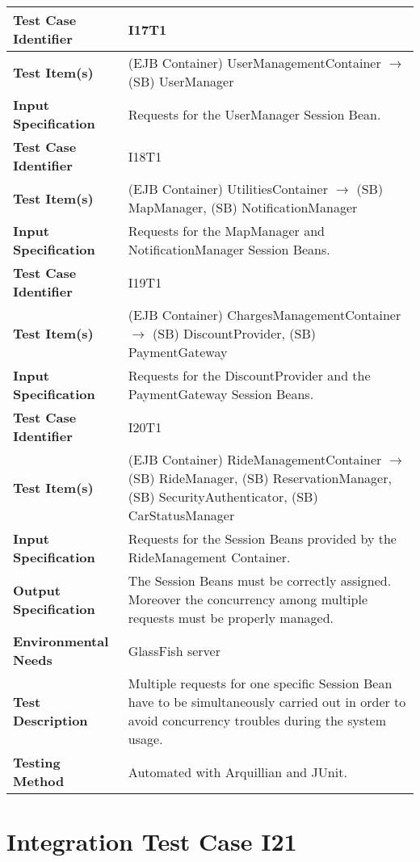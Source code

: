 \begin{longtable}{p{} | p{}}
\hline
\textbf{Test Case Identifier} & I17T1\\
\hline
\textbf{Test Item(s)} & (EJB Container) UserManagementContainer $\rightarrow$ (SB) UserManager \\
\hline
\textbf{Input Specification} & Requests for the UserManager Session Bean. \\
\hline
\hline
\textbf{Test Case Identifier} & I18T1\\
\hline
\textbf{Test Item(s)} & (EJB Container) UtilitiesContainer $\rightarrow$ (SB) MapManager, (SB) NotificationManager \\
\hline
\textbf{Input Specification} & Requests for the MapManager and NotificationManager Session Beans. \\
\hline
\hline
\textbf{Test Case Identifier} & I19T1\\
\hline
\textbf{Test Item(s)} & (EJB Container) ChargesManagementContainer $\rightarrow$ (SB) DiscountProvider, (SB) PaymentGateway \\
\hline
\textbf{Input Specification} & Requests for the DiscountProvider and the PaymentGateway Session Beans. \\
\hline
\hline
\textbf{Test Case Identifier} & I20T1\\
\hline
\textbf{Test Item(s)} & (EJB Container) RideManagementContainer $\rightarrow$ (SB) RideManager, (SB) ReservationManager, (SB) SecurityAuthenticator, (SB) CarStatusManager \\
\hline
\textbf{Input Specification} & Requests for the Session Beans provided by the RideManagement Container. \\
\hline
\hline
\textbf{Output Specification} & The Session Beans must be correctly assigned. Moreover the concurrency among multiple requests must be properly managed. \\
\hline
\textbf{Environmental Needs} & GlassFish server \\
\hline
\textbf{Test Description} & Multiple requests for one specific Session Bean have to be simultaneously carried out in order to avoid concurrency troubles during the system usage. \\
\hline
\textbf{Testing Method} & Automated with Arquillian and JUnit. \\
\hline
\end{longtable}

\section{Integration Test Case I21}

